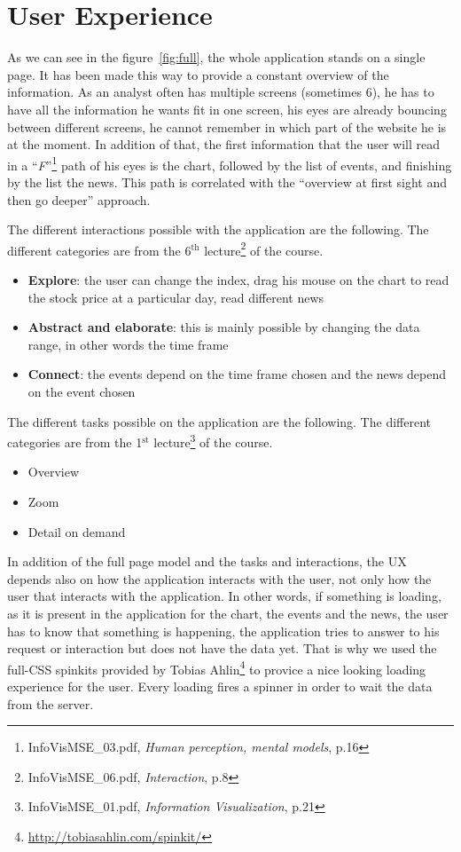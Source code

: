 \section{User Experience}
As we can see in the figure~\ref{fig:full}, the whole application stands on a single page. It has been made this way to provide a constant overview of the information. As an analyst often has multiple screens (sometimes 6), he has to have all the information he wants fit in one screen, his eyes are already bouncing between different screens, he cannot remember in which part of the website he is at the moment. In addition of that, the first information that the user will read in a ``\textit{F}''\footnote{InfoVisMSE\_03.pdf, \textit{Human perception, mental models}, p.16} path of his eyes is the chart, followed by the list of events, and finishing by the list the news. This path is correlated with the ``overview at first sight and then go deeper'' approach.

The different interactions possible with the application are the following. The different categories are from the 6$^{\text{th}}$ lecture\footnote{InfoVisMSE\_06.pdf, \textit{Interaction}, p.8} of the course.
\begin{itemize}
    \item \textbf{Explore}: the user can change the index, drag his mouse on the chart to read the stock price at a particular day, read different news
    \item \textbf{Abstract and elaborate}: this is mainly possible by changing the data range, in other words the time frame
    \item \textbf{Connect}: the events depend on the time frame chosen and the news depend on the event chosen
\end{itemize}

The different tasks possible on the application are the following. The different categories are from the 1$^{\text{st}}$ lecture\footnote{InfoVisMSE\_01.pdf, \textit{Information Visualization}, p.21} of the course.
\begin{itemize}
    \item Overview
    \item Zoom
    \item Detail on demand
\end{itemize}

In addition of the full page model and the tasks and interactions, the UX depends also on how the application interacts with the user, not only how the user that interacts with the application. In other words, if something is loading, as it is present in the application for the chart, the events and the news, the user has to know that something is happening, the application tries to answer to his request or interaction but does not have the data yet. That is why we used the full-CSS spinkits provided by Tobias Ahlin\footnote{\url{http://tobiasahlin.com/spinkit/}} to provice a nice looking loading experience for the user. Every loading fires a spinner in order to wait the data from the server.


